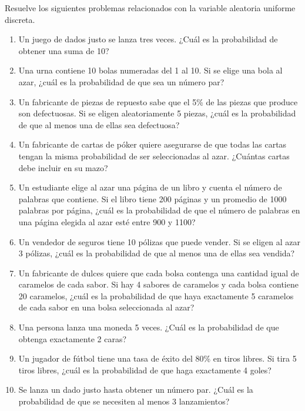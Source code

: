 \begin{Ejer}
\textrm{Resuelve los siguientes problemas relacionados con la variable aleatoria uniforme discreta.}

\begin{enumerate}
    \item Un juego de dados justo se lanza tres veces. ¿Cu\'al es la probabilidad de obtener una suma de 10?

    \item Una urna contiene 10 bolas numeradas del 1 al 10. Si se elige una bola al azar, ¿cu\'al es la probabilidad de que sea un n\'umero par?

    \item Un fabricante de piezas de repuesto sabe que el 5\% de las piezas que produce son defectuosas. Si se eligen aleatoriamente 5 piezas, ¿cu\'al es la probabilidad de que al menos una de ellas sea defectuosa?

    \item Un fabricante de cartas de p\'oker quiere asegurarse de que todas las cartas tengan la misma probabilidad de ser seleccionadas al azar. ¿Cu\'antas cartas debe incluir en su mazo?

    \item Un estudiante elige al azar una p\'agina de un libro y cuenta el n\'umero de palabras que contiene. Si el libro tiene 200 p\'aginas y un promedio de 1000 palabras por p\'agina, ¿cu\'al es la probabilidad de que el n\'umero de palabras en una p\'agina elegida al azar est\'e entre 900 y 1100?

    \item Un vendedor de seguros tiene 10 p\'olizas que puede vender. Si se eligen al azar 3 p\'olizas, ¿cu\'al es la probabilidad de que al menos una de ellas sea vendida?

    \item Un fabricante de dulces quiere que cada bolsa contenga una cantidad igual de caramelos de cada sabor. Si hay 4 sabores de caramelos y cada bolsa contiene 20 caramelos, ¿cu\'al es la probabilidad de que haya exactamente 5 caramelos de cada sabor en una bolsa seleccionada al azar?

    \item Una persona lanza una moneda 5 veces. ¿Cu\'al es la probabilidad de que obtenga exactamente 2 caras?

    \item Un jugador de f\'utbol tiene una tasa de \'exito del 80\% en tiros libres. Si tira 5 tiros libres, ¿cu\'al es la probabilidad de que haga exactamente 4 goles?

    \item Se lanza un dado justo hasta obtener un n\'umero par. ¿Cu\'al es la probabilidad de que se necesiten al menos 3 lanzamientos?
\end{enumerate}
\end{Ejer}



